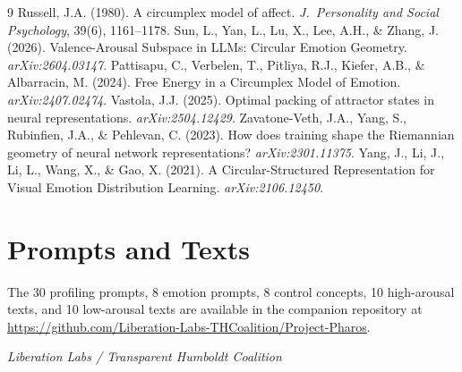 \documentclass[11pt,a4paper]{article}
\begin{document}

\begin{thebibliography}{9}
 Russell, J.A. (1980). A circumplex model of affect. \textit{J.~Personality and Social Psychology}, 39(6), 1161--1178.
 Sun, L., Yan, L., Lu, X., Lee, A.H., \& Zhang, J. (2026). Valence-Arousal Subspace in LLMs: Circular Emotion Geometry. \textit{arXiv:2604.03147}.
 Pattisapu, C., Verbelen, T., Pitliya, R.J., Kiefer, A.B., \& Albarracin, M. (2024). Free Energy in a Circumplex Model of Emotion. \textit{arXiv:2407.02474}.
 Vastola, J.J. (2025). Optimal packing of attractor states in neural representations. \textit{arXiv:2504.12429}.
 Zavatone-Veth, J.A., Yang, S., Rubinfien, J.A., \& Pehlevan, C. (2023). How does training shape the Riemannian geometry of neural network representations? \textit{arXiv:2301.11375}.
 Yang, J., Li, J., Li, L., Wang, X., \& Gao, X. (2021). A Circular-Structured Representation for Visual Emotion Distribution Learning. \textit{arXiv:2106.12450}.
\end{thebibliography}

\appendix
\section{Prompts and Texts}

The 30 profiling prompts, 8 emotion prompts, 8 control concepts, 10 high-arousal texts, and 10 low-arousal texts are available in the companion repository at \url{https://github.com/Liberation-Labs-THCoalition/Project-Pharos}.

\vspace{1em}
\noindent\textit{Liberation Labs / Transparent Humboldt Coalition}
\end{document}
